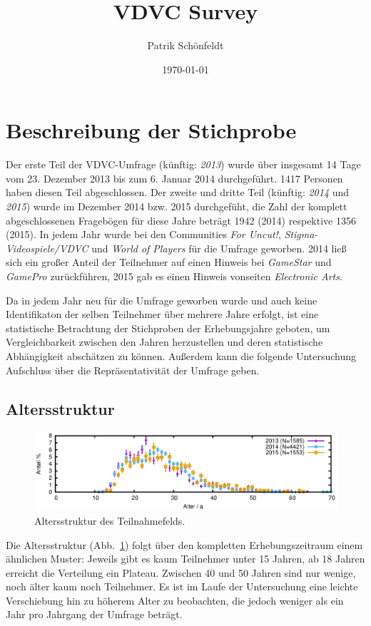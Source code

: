 \documentclass[11pt]{scrartcl}
\title{VDVC Survey}
\author{Patrik Schönfeldt}
\date{\today}
\begin{document}
\maketitle

\section{Beschreibung der Stichprobe}
Der erste Teil der VDVC-Umfrage (künftig: \emph{2013})
wurde über insgesamt 14 Tage
vom 23. Dezember 2013 bis zum 6. Januar 2014 durchgeführt.
1417 Personen haben diesen Teil abgeschlossen.
Der zweite und dritte Teil (künftig: \emph{2014} und \emph{2015})
wurde im Dezember 2014 bzw. 2015 durchgefüht,
die Zahl der komplett abgeschlossenen Fragebögen für diese Jahre beträgt 
1942 (2014) respektive 1356 (2015).
In jedem Jahr wurde bei den Communities \emph{For Uncut!},
\emph{Stigma-Videospiele/VDVC} und \emph{World of Players} für die Umfrage
geworben.
2014 ließ sich ein großer Anteil der Teilnehmer auf einen
Hinweis bei \emph{GameStar} und \emph{GamePro} zurückführen,
2015 gab es einen Hinweis vonseiten \emph{Electronic Arts}.

Da in jedem Jahr neu für die Umfrage geworben wurde und auch keine
Identifikaton der selben Teilnehmer über mehrere Jahre erfolgt,
ist eine statistische Betrachtung der Stichproben der Erhebungsjahre
geboten,
um Vergleichbarkeit zwischen den Jahren herzustellen und deren
statistische Abhängigkeit abschätzen zu können.
Außerdem kann die folgende Untersuchung
Aufschluss über die Repräsentativität der Umfrage geben.


\subsection{Altersstruktur}

\begin{figure}[htb]
	\centering
	\includegraphics[width=15cm]{vgl/alter}
	\caption[Altersstruktur]
	{Altersstruktur des Teilnahmefelds.}
	\label{fig: alter}
\end{figure}

Die Altersstruktur (Abb.~\ref{fig: alter}) folgt über
den kompletten Erhebungszeitraum einem	ähnlichen Muster:
Jeweils gibt es kaum Teilnehmer unter 15 Jahren,
ab 18 Jahren erreicht die Verteilung ein Plateau.
Zwischen 40 und 50 Jahren sind nur wenige, noch älter kaum noch Teilnehmer.
Es ist im Laufe der Untersuchung eine leichte Verschiebung hin zu höherem
Alter zu beobachten, die jedoch weniger als ein Jahr pro Jahrgang der Umfrage
beträgt.
\end{document}
